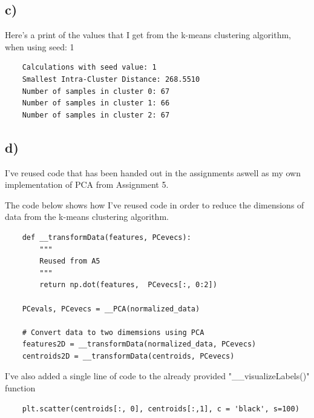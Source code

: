 \subsection {c)}
Here's a print of the values that I get from the k-means clustering algorithm, when
using seed: 1
\begin{verbatim}
    Calculations with seed value: 1
    Smallest Intra-Cluster Distance: 268.5510
    Number of samples in cluster 0: 67
    Number of samples in cluster 1: 66
    Number of samples in cluster 2: 67
\end{verbatim}

\subsection {d)}
I've reused code that has been handed out in the assignments aswell
as my own implementation of PCA from Assignment 5.

The code below shows how I've reused code in order to reduce the 
dimensions of data from the k-means clustering algorithm.
\begin{verbatim}
    def __transformData(features, PCevecs):
        """
        Reused from A5
        """
        return np.dot(features,  PCevecs[:, 0:2])

    PCevals, PCevecs = __PCA(normalized_data)

    # Convert data to two dimemsions using PCA
    features2D = __transformData(normalized_data, PCevecs)
    centroids2D = __transformData(centroids, PCevecs)
\end{verbatim}

I've also added a single line of code to the already provided
"\_\_visualizeLabels()" function

\begin{verbatim}
    plt.scatter(centroids[:, 0], centroids[:,1], c = 'black', s=100)
\end{verbatim}


